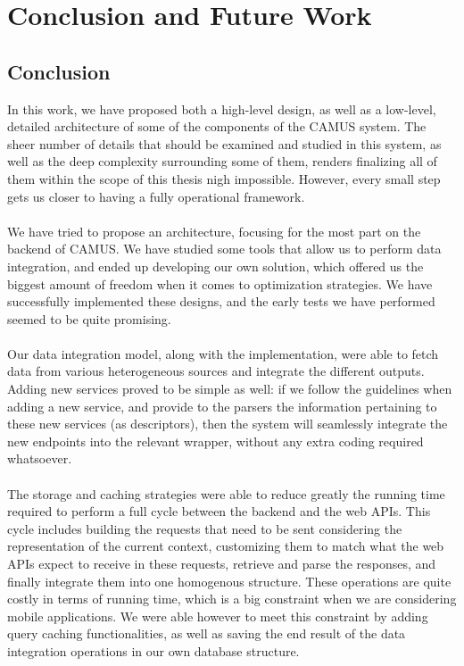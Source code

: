 \chapter{Conclusion and Future Work}
\label{capitolo8}
\thispagestyle{empty}
\section{Conclusion}
In this work, we have proposed both a high-level design, as well as a low-level, detailed architecture of some of the components of the CAMUS system. The sheer number of details that should be examined and studied in this system, as well as the deep complexity surrounding some of them, renders finalizing all of them within the scope of this thesis nigh impossible. However, every small step gets us closer to having a fully operational framework.\\\\
We have tried to propose an architecture, focusing for the most part on the backend of CAMUS. We have studied some tools that allow us to perform data integration, and ended up developing our own solution, which offered us the biggest amount of freedom when it comes to optimization strategies. We have successfully implemented these designs, and the early tests we have performed seemed to be quite promising.\\\\
Our data integration model, along with the implementation, were able to fetch data from various heterogeneous sources and integrate the different outputs. Adding new services proved to be simple as well: if we follow the guidelines when adding a new service, and provide to the parsers the information pertaining to these new services (as descriptors), then the system will seamlessly integrate the new endpoints into the relevant wrapper, without any extra coding required whatsoever.\\\\
The storage and caching strategies were able to reduce greatly the running time required to perform a full cycle between the backend and the web APIs. This cycle includes building the requests that need to be sent considering the representation of the current context, customizing them to match what the web APIs expect to receive in these requests, retrieve and parse the responses, and finally integrate them into one homogenous structure. These operations are quite costly in terms of running time, which is a big constraint when we are considering mobile applications. We were able however to meet this constraint by adding query caching functionalities, as well as saving the end result of the data integration operations in our own database structure.\\\\
